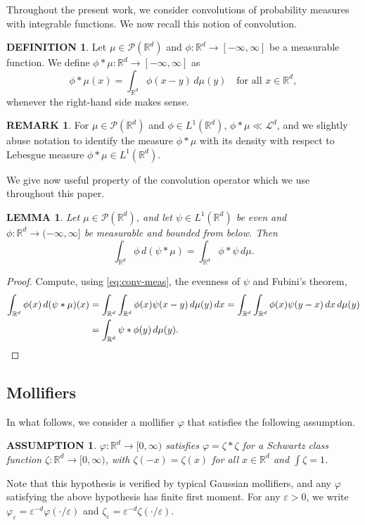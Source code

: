 \documentclass[11pt,leqno]{amsart}
\newtheorem{lem}[thm]{LEMMA}
\newtheorem{as}[thm]{ASSUMPTION}
\theoremstyle{definition}
\newtheorem{defi}[thm]{DEFINITION}
\newtheorem{remark}[thm]{REMARK}
\newcommand{\be}{\begin{equation}}
\newcommand{\ee}{\end{equation}}
\newcommand{\bes}{\begin{equation*}}
\newcommand{\ees}{\end{equation*}}
\newcommand{\R}{{\mathord{\mathbb R}}}
\newcommand{\Rd}{{\mathord{\mathbb R}^d}}
\def\P{{\mathcal P}}
\def\epsilon{\varepsilon}
\def\e{\varepsilon}
\newcommand{\ird}{\int_{\mathord{\mathbb R}^d}}
\begin{document}
Throughout the present work, we consider convolutions of probability measures with integrable functions. We now recall this notion of convolution.
\begin{defi} \label{def:conv}
Let $\mu \in\P(\Rd)$ and $\phi\colon \R^d \to [-\infty,\infty]$ be a measurable function. We define $\phi*\mu\colon \R^d \to[-\infty,\infty]$ as
\be\label{eq:conv-meas}
	\phi*\mu(x) = \int_{\Rd} \phi(x-y) \,d\mu(y) \quad \mbox{for all $x\in\Rd$},
\ee
whenever the right-hand side makes sense.
\end{defi}

\begin{remark} \label{rem:properties}
	For $\mu \in \P(\Rd)$ and $\phi \in L^1(\Rd)$, $\phi*\mu \ll \mathcal{L}^d$, and we slightly abuse notation to identify the measure $\phi*\mu$ with its density with respect to Lebesgue measure  $\phi*\mu \in L^1(\Rd)$. %
\end{remark}

We give now useful property of the convolution operator which we use throughout this paper.
\begin{lem} \label{convolutionlemma}
	Let $\mu\in\P(\R^d)$, and let $\psi\in L^1(\R^d)$ be even and $\phi\colon\R^d \to (-\infty,\infty]$ be measurable and bounded from below. Then
\bes
	\ird \phi \,d(\psi*\mu) = \ird \phi*\psi \,d\mu.
\ees
\end{lem}
\begin{proof}
	Compute, using \eqref{eq:conv-meas}, the evenness of $\psi$ and Fubini's theorem,
\begin{align*}
	\ird \phi(x) \,d(\psi*\mu)(x) &= \ird \ird \phi(x) \psi(x-y) \,d\mu(y) \,dx = \ird \ird \phi(x) \psi(y-x) \,dx \,d\mu(y)\\
	&= \ird \psi*\phi(y) \,d\mu(y). \qedhere
\end{align*}
\end{proof}

\subsection{Mollifiers}
In what follows, we consider a mollifier $\varphi$ that satisfies the following assumption.
\begin{as} \label{mollifierAssumption}
$\varphi\colon\Rd \to [0,\infty)$ satisfies $\varphi = \zeta * \zeta$ for a Schwartz class function $\zeta: \Rd \to [0,\infty)$, with $\zeta(-x) = \zeta(x)$ for all $x\in\Rd$ and $\int \zeta = 1$.  \end{as}
Note that this hypothesis is verified by typical Gaussian mollifiers, and any $\varphi$ satisfying the above hypothesis has finite first moment. For any $\epsilon >0$, we write $\varphi_\e =  \e^{-d} \varphi (\cdot/\e)$ and $\zeta_\e = \e^{-d} \zeta(\cdot/\e)$.
\end{document}
